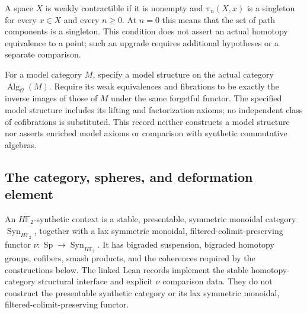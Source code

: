 \begin{definition}
  \label{def:weak-contractible-space}
  \leanok
  A space $X$ is weakly contractible if it is nonempty and
  $\pi_n(X,x)$ is a singleton for every $x\in X$ and every $n\geq0$.
  At $n=0$ this means that the set of path components is a singleton.
  This condition does not assert an actual homotopy equivalence to a point;
  such an upgrade requires additional hypotheses or a separate comparison.
\end{definition}

\begin{definition}
  \label{def:transferred-operadic-model}
  For a model category $M$, specify a model structure on the actual
  category $\operatorname{Alg}_{\mathcal O}(M)$. Require its weak
  equivalences and fibrations to be exactly the inverse images of those
  of $M$ under the same forgetful functor. The specified model structure
  includes its lifting and factorization axioms; no independent class of
  cofibrations is substituted. This record neither constructs a model
  structure nor asserts enriched model axioms or comparison with synthetic
  commutative algebras.
\end{definition}

\subsection{The category, spheres, and deformation element}

\begin{definition}
  \label{def:synthetic-context}
  \notready
  An $H\mathbb F_2$-synthetic context is a stable, presentable, symmetric
  monoidal category $\operatorname{Syn}_{H\mathbb F_2}$, together with a lax
  symmetric monoidal, filtered-colimit-preserving functor
  $\nu:\operatorname{Sp}\to\operatorname{Syn}_{H\mathbb F_2}$.  It has
  bigraded suspension, bigraded homotopy groups, cofibers, smash products, and
  the coherences required by the constructions below.
  The linked Lean records implement the stable homotopy-category structural
  interface and explicit $\nu$ comparison data. They do not construct the
  presentable synthetic category or its lax symmetric monoidal,
  filtered-colimit-preserving functor.
\end{definition}

